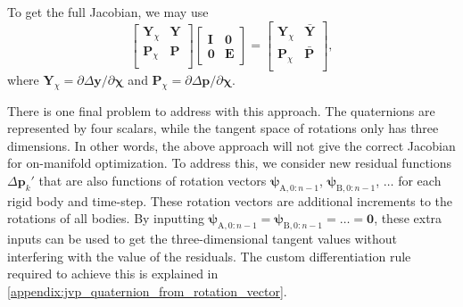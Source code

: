 \documentclass[preprint,12pt]{elsarticle}
\let\vec\bm
\let\mat\mathbf
\def\param{\vec{\chi}}
\numberwithin{equation}{section}
\def\rv{\psi}
\def\tA{\text{A}}
\def\tB{\text{B}}
\begin{document}
To get the full Jacobian, we may use
\begin{equation}
    \begin{bmatrix}
        \mat{Y}_\chi & \mat{Y} \\
        \mat{P}_\chi & \mat{P} \\
    \end{bmatrix}
    \begin{bmatrix}
        \mat{I} & \mat{0} \\
        \mat{0} & \mat{E}
    \end{bmatrix}
    =
    \begin{bmatrix}
        \mat{Y}_\chi & \bar{\mat{Y}} \\
        \mat{P}_\chi & \bar{\mat{P}} \\
    \end{bmatrix},
\end{equation}
where $\mat{Y}_\chi = \partial \Delta \vec{y} / \partial \param$ and  $\mat{P}_\chi = \partial \Delta \vec{p} / \partial \param$.

There is one final problem to address with this approach.
The quaternions are represented by four scalars, while the tangent space of rotations only has three dimensions.
In other words, the above approach will not give the correct Jacobian for on-manifold optimization.
To address this, we consider new residual functions $\Delta \vec{p}_k'$ that are also functions of rotation vectors $\vec{\rv}_{\tA, 0:n-1}$, $\vec{\rv}_{\tB, 0:n-1}$, $\hdots$ for each rigid body and time-step.
These rotation vectors are additional increments to the rotations of all bodies.
By inputting $\vec{\rv}_{\tA, 0:n-1} = \vec{\rv}_{\tB, 0:n-1} = \hdots = \vec{0}$, these extra inputs can be used to get the three-dimensional tangent values without interfering with the value of the residuals.
The custom differentiation rule required to achieve this is explained in \ref{appendix:jvp_quaternion_from_rotation_vector}.
\end{document}
